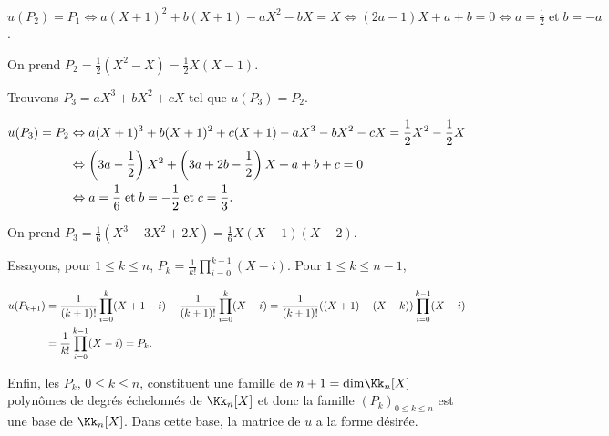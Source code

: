 {\begin{enumerate}
{\begin{center}
$u(P_2) =P_1\Leftrightarrow a(X+1)^2 +b(X+1) - aX^2 - bX =X\Leftrightarrow (2a-1)X +a+b =0\Leftrightarrow a =\frac{1}{2}\;\text{et}\;b = -a$.
\end{center}

On prend $P_2=\frac{1}{2}(X^2-X)=\frac{1}{2}X(X-1)$.

Trouvons $P_3=aX^3 + bX^2+cX$ tel que $u(P_3) = P_2$.

\begin{align*}\ensuremath
u(P_3) =P_2&\Leftrightarrow a(X+1)^3 +b(X+1)^2+c(X+1) - aX^3 - bX^2-cX =\frac{1}{2}X^2-\frac{1}{2}X\\
 &\Leftrightarrow \left(3a-\frac{1}{2}\right)X^2+\left(3a+2b-\frac{1}{2}\right)X+a+b+c=0\\
 &\Leftrightarrow a =\frac{1}{6}\;\text{et}\;b =-\frac{1}{2}\;\text{et}\;c=\frac{1}{3}.
\end{align*}

On prend $P_3=\frac{1}{6}(X^3-3X^2+2X)=\frac{1}{6}X(X-1)(X-2)$.

Essayons, pour $1\leqslant k\leqslant n$, $P_k=\frac{1}{k!}\prod_{i=0}^{k-1}(X-i)$. Pour $1\leqslant k\leqslant n-1$,

\begin{align*}\ensuremath
u(P_{k+1})&=\frac{1}{(k+1)!}\prod_{i=0}^{k}(X+1-i)-\frac{1}{(k+1)!}\prod_{i=0}^{k}(X-i)=\frac{1}{(k+1)!}((X+1)-(X-k))\prod_{i=0}^{k-1}(X-i)\\
 &=\frac{1}{k!}\prod_{i=0}^{k-1}(X-i)=P_k.
\end{align*}

Enfin, les $P_k$, $0\leqslant k\leqslant n$, constituent une famille de $n+1=\text{dim}\Kk_n[X]$ polynômes de degrés échelonnés de $\Kk_n[X]$ et donc la famille $(P_k)_{0\leqslant k\leqslant n}$ est une base de $\Kk_n[X]$. Dans cette base, la matrice de $u$ a la forme désirée.}
\end{enumerate}
}
